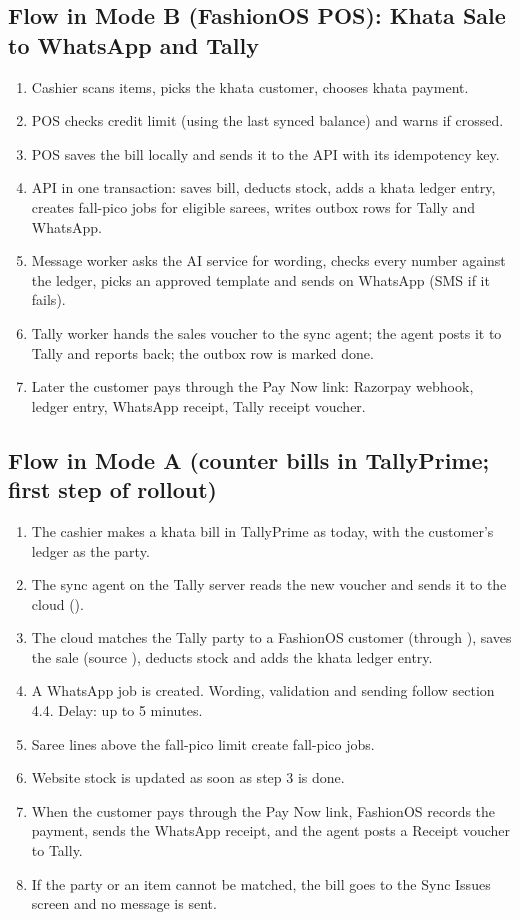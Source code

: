 \documentclass[11pt,a4paper]{article}
\newcommand{\code}[1]{\texttt{\detokenize{#1}}}
\begin{document}
\subsection{Flow in Mode B (FashionOS POS): Khata Sale to WhatsApp and Tally}
\begin{enumerate}
\item Cashier scans items, picks the khata customer, chooses khata payment.
\item POS checks credit limit (using the last synced balance) and warns if crossed.
\item POS saves the bill locally and sends it to the API with its idempotency key.
\item API in one transaction: saves bill, deducts stock, adds a khata ledger entry, creates fall-pico jobs for eligible sarees, writes outbox rows for Tally and WhatsApp.
\item Message worker asks the AI service for wording, checks every number against the ledger, picks an approved template and sends on WhatsApp (SMS if it fails).
\item Tally worker hands the sales voucher to the sync agent; the agent posts it to Tally and reports back; the outbox row is marked done.
\item Later the customer pays through the Pay Now link: Razorpay webhook, ledger entry, WhatsApp receipt, Tally receipt voucher.
\end{enumerate}

\subsection{Flow in Mode A (counter bills in TallyPrime; first step of rollout)}
\begin{enumerate}
\item The cashier makes a khata bill in TallyPrime as today, with the customer's ledger as the party.
\item The sync agent on the Tally server reads the new voucher and sends it to the cloud (\code{/tally/inbox}).
\item The cloud matches the Tally party to a FashionOS customer (through \code{tally_ledger_map}), saves the sale (source \code{tally_import}), deducts stock and adds the khata ledger entry.
\item A WhatsApp job is created. Wording, validation and sending follow section 4.4. Delay: up to 5 minutes.
\item Saree lines above the fall-pico limit create fall-pico jobs.
\item Website stock is updated as soon as step 3 is done.
\item When the customer pays through the Pay Now link, FashionOS records the payment, sends the WhatsApp receipt, and the agent posts a Receipt voucher to Tally.
\item If the party or an item cannot be matched, the bill goes to the Sync Issues screen and no message is sent.
\end{enumerate}
\end{document}
